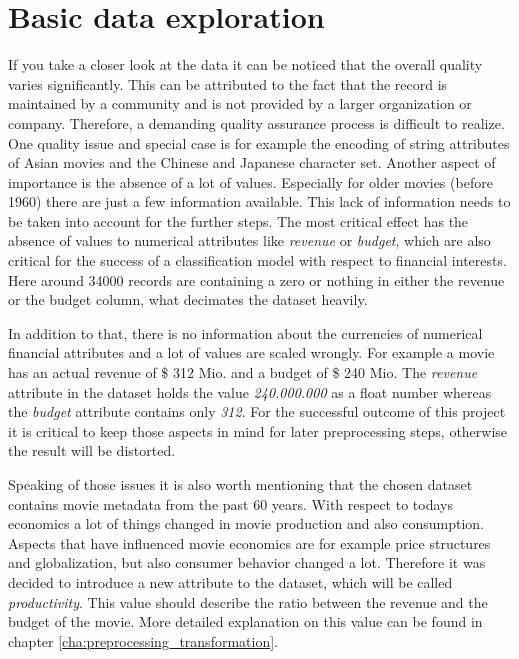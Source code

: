 \section{Basic data exploration}
If you take a closer look at the data it can be noticed that the overall quality varies significantly. This can be attributed to the fact that the record is maintained by a community and is not provided by a larger organization or company. Therefore, a demanding quality assurance process is difficult to realize. One  quality issue and special case is for example the encoding of string attributes of Asian movies and the Chinese and Japanese character set. Another aspect of importance is the absence of a lot of values. Especially for older movies (before 1960) there are just a few information available. This lack of information needs to be taken into account for the further steps. The most critical effect has the absence of values to numerical attributes like \textit{revenue} or \textit{budget}, which are also critical for the success of a classification model with respect to financial interests. Here around 34000 records are containing a zero or nothing in either the revenue or the budget column, what decimates the dataset heavily. 

In addition to that, there is no information about the currencies of numerical financial attributes and a lot of values are scaled wrongly. For example a movie has an actual revenue of \$ 312 Mio. and a budget of \$ 240 Mio. The \textit{revenue} attribute in the dataset holds the value \textit{240.000.000} as a float number whereas the \textit{budget} attribute contains only \textit{312}. For the successful outcome of this project it is critical to keep those aspects in mind for later preprocessing steps, otherwise the result will be distorted. 

Speaking of those issues it is also worth mentioning that the chosen dataset contains movie metadata from the past 60 years. With respect to todays economics a lot of things changed in movie production and also consumption. Aspects that have influenced movie economics are for example price structures and globalization, but also consumer behavior changed a lot. Therefore it was decided to introduce a new attribute to the dataset, which will be called \textit{productivity}. This value should describe the ratio between the revenue and the budget of the movie. More detailed explanation on this value can be found in chapter \ref{cha:preprocessing_transformation}. 
\\

